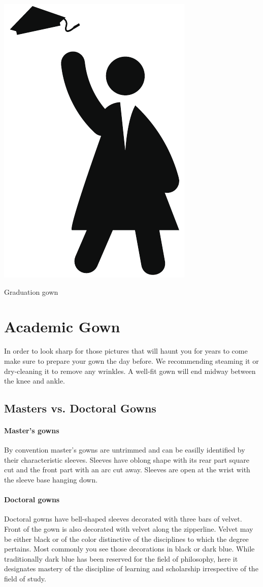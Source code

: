 \documentclass{tufte-handout}
\begin{document}
\begin{marginfigure}[\baselineskip]%
  \includegraphics[width=.4\linewidth]{gownbw}
  \caption{\linespread{1.3}\selectfont{}Graduation gown}
  \label{fig:gown}
\end{marginfigure}

\section{Academic Gown}
In order to look sharp for those pictures that will haunt you for years to come make sure to prepare your gown the day before. We recommending steaming it or dry-cleaning it to remove any wrinkles. A well-fit gown will end midway between the knee and ankle.

\subsection{Masters vs. Doctoral Gowns}

\paragraph{Master's gowns} By convention master's gowns are untrimmed and can be easilly identified by their characteristic sleeves. Sleeves have oblong shape with its rear part square cut and the front part with an arc cut away. Sleeves are open at the wrist with the sleeve base hanging down.

\paragraph{Doctoral gowns} Doctoral gowns have bell-shaped sleeves decorated with three bars of velvet. Front of the gown is also decorated with velvet along the zipperline. Velvet may be either black or of the color distinctive of the disciplines to which the degree pertains. Most commonly you see those decorations in black or dark blue. While traditionally dark blue has been reserved for the field of philosophy, here it designates mastery of the discipline of learning and scholarship irrespective of the field of study. 
\end{document}
